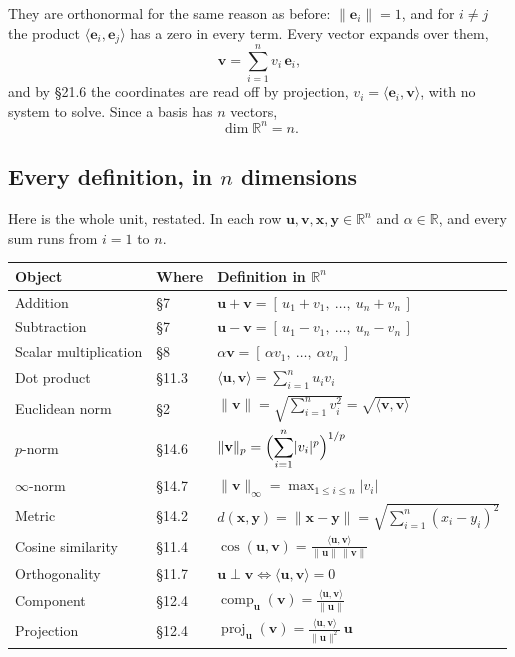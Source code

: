 \documentclass[11pt]{article}
\theoremstyle{definition}
\theoremstyle{remark}
\newcommand{\R}{\mathbb{R}}
\newcommand{\vc}[1]{\mathbf{#1}}
\newcommand{\norm}[1]{\lVert #1\rVert}
\newcommand{\proj}[2]{\operatorname{proj}_{#1}(#2)}
\newcommand{\comp}[2]{\operatorname{comp}_{#1}(#2)}
\begin{document}
They are orthonormal for the same reason as before: $\norm{\vc{e}_i}=1$, and for
$i\neq j$ the product $\langle\vc{e}_i,\vc{e}_j\rangle$ has a zero in every term.
Every vector expands over them,
\[
  \vc{v} = \sum_{i=1}^{n} v_i\,\vc{e}_i ,
\]
and by \S21.6 the coordinates are read off by projection, $v_i=\langle\vc{e}_i,\vc{v}\rangle$,
with no system to solve. Since a basis has $n$ vectors,
\[
  \dim\R^{n}=n .
\]

\subsection{Every definition, in \texorpdfstring{$n$}{n} dimensions}
Here is the whole unit, restated. In each row $\vc{u},\vc{v},\vc{x},\vc{y}\in\R^{n}$
and $\alpha\in\R$, and every sum runs from $i=1$ to $n$.

\begin{center}
\renewcommand{\arraystretch}{2.0}
\begin{tabular}{@{}l l l@{}}
\toprule
\textbf{Object} & \textbf{Where} & \textbf{Definition in $\R^{n}$} \\
\midrule
Addition & \S7
  & $\vc{u}+\vc{v} = [\,u_1+v_1,\ \dots,\ u_n+v_n\,]$ \\
Subtraction & \S7
  & $\vc{u}-\vc{v} = [\,u_1-v_1,\ \dots,\ u_n-v_n\,]$ \\
Scalar multiplication & \S8
  & $\alpha\vc{v} = [\,\alpha v_1,\ \dots,\ \alpha v_n\,]$ \\
Dot product & \S11.3
  & $\displaystyle\langle\vc{u},\vc{v}\rangle=\sum_{i=1}^{n}u_iv_i$ \\
Euclidean norm & \S2
  & $\displaystyle\norm{\vc{v}}=\sqrt{\sum_{i=1}^{n}v_i^{2}}=\sqrt{\langle\vc{v},\vc{v}\rangle}$ \\
$p$-norm & \S14.6
  & $\displaystyle\norm{\vc{v}}_p=\Bigl(\sum_{i=1}^{n}\lvert v_i\rvert^{p}\Bigr)^{1/p}$ \\
$\infty$-norm & \S14.7
  & $\displaystyle\norm{\vc{v}}_\infty=\max_{1\le i\le n}\lvert v_i\rvert$ \\
Metric & \S14.2
  & $\displaystyle d(\vc{x},\vc{y})=\norm{\vc{x}-\vc{y}}=\sqrt{\sum_{i=1}^{n}(x_i-y_i)^{2}}$ \\
Cosine similarity & \S11.4
  & $\displaystyle\cos(\vc{u},\vc{v})=\frac{\langle\vc{u},\vc{v}\rangle}{\norm{\vc{u}}\,\norm{\vc{v}}}$ \\
Orthogonality & \S11.7
  & $\vc{u}\perp\vc{v} \iff \langle\vc{u},\vc{v}\rangle=0$ \\
Component & \S12.4
  & $\displaystyle\comp{\vc{u}}{\vc{v}}=\frac{\langle\vc{u},\vc{v}\rangle}{\norm{\vc{u}}}$ \\
Projection & \S12.4
  & $\displaystyle\proj{\vc{u}}{\vc{v}}=\frac{\langle\vc{u},\vc{v}\rangle}{\norm{\vc{u}}^{2}}\,\vc{u}$ \\
\bottomrule
\end{tabular}
\end{center}
\end{document}
